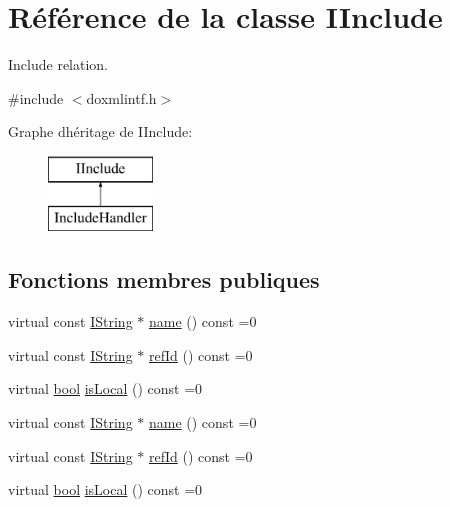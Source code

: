 \hypertarget{class_i_include}{}\section{Référence de la classe I\+Include}
\label{class_i_include}


Include relation.  




{\ttfamily \#include $<$doxmlintf.\+h$>$}

Graphe d\textquotesingle{}héritage de I\+Include\+:\begin{figure}[H]
\begin{center}
\leavevmode
\includegraphics[height=2.000000cm]{class_i_include}
\end{center}
\end{figure}
\subsection*{Fonctions membres publiques}
\begin{DoxyCompactItemize}
\item 
virtual const \hyperlink{class_i_string}{I\+String} $\ast$ \hyperlink{class_i_include_ab117b9881fd1fa18023bb73565893b12}{name} () const  =0
\item 
virtual const \hyperlink{class_i_string}{I\+String} $\ast$ \hyperlink{class_i_include_af1349c4ac643a8a05ebee11cd5c59938}{ref\+Id} () const  =0
\item 
virtual \hyperlink{qglobal_8h_a1062901a7428fdd9c7f180f5e01ea056}{bool} \hyperlink{class_i_include_a8e511e8a8c9b08328fea65423a100362}{is\+Local} () const  =0
\item 
virtual const \hyperlink{class_i_string}{I\+String} $\ast$ \hyperlink{class_i_include_ab117b9881fd1fa18023bb73565893b12}{name} () const  =0
\item 
virtual const \hyperlink{class_i_string}{I\+String} $\ast$ \hyperlink{class_i_include_af1349c4ac643a8a05ebee11cd5c59938}{ref\+Id} () const  =0
\item 
virtual \hyperlink{qglobal_8h_a1062901a7428fdd9c7f180f5e01ea056}{bool} \hyperlink{class_i_include_a8e511e8a8c9b08328fea65423a100362}{is\+Local} () const  =0
\end{DoxyCompactItemize}


